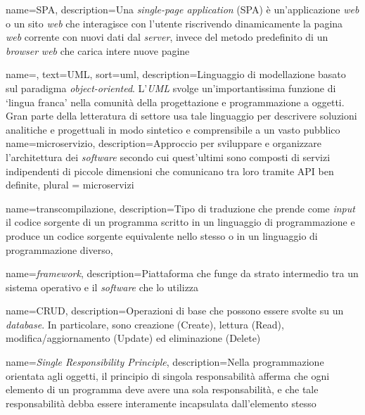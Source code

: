 {
    name=SPA,
    description={Una \textit{single-page application} (SPA) è un'applicazione
            \textit{web} o un sito \textit{web} che interagisce con l'utente riscrivendo
            dinamicamente la pagina \textit{web} corrente con nuovi dati dal
            \textit{server}, invece del metodo predefinito di un \textit{browser}
            \textit{web} che carica intere nuove pagine}
}

{
    name=,
    text=UML,
    sort=uml,
    description={Linguaggio di modellazione basato sul paradigma
            \textit{object-oriented}. L'\emph{UML} svolge un'importantissima funzione di
            \enquote*{lingua franca} nella comunità della progettazione e programmazione a
            oggetti. Gran parte della letteratura di settore usa tale linguaggio per
            descrivere soluzioni analitiche e progettuali in modo sintetico e comprensibile
            a un vasto pubblico}
}
{
    name={microservizio},
    description={Approccio per sviluppare e organizzare l'architettura dei
            \textit{software} secondo cui quest’ultimi sono composti di servizi
            indipendenti di piccole dimensioni che comunicano tra loro tramite \gls{API}
            ben definite},
    plural = {microservizi}
}

{
    name={transcompilazione},
    description={Tipo di traduzione
            che prende come \textit{input} il codice sorgente di un programma scritto
            in un linguaggio di programmazione e produce un codice sorgente equivalente
            nello stesso o in un linguaggio di programmazione diverso},
}

{
    name={\textit{framework}},
    description={Piattaforma che funge da strato intermedio tra un sistema
            operativo e il \textit{software} che lo utilizza}
}

{
    name={CRUD},
    description={Operazioni di base che possono essere svolte su un
            \textit{database}. In particolare,
            sono creazione (Create), lettura (Read), modifica/aggiornamento (Update) ed
            eliminazione (Delete)}
}

{
    name=\textit{Single Responsibility Principle},
    description={Nella programmazione orientata agli oggetti, il principio di
            singola responsabilità afferma che ogni elemento di un programma deve avere una
            sola responsabilità, e che tale responsabilità debba essere interamente
            incapsulata dall'elemento stesso}
}

